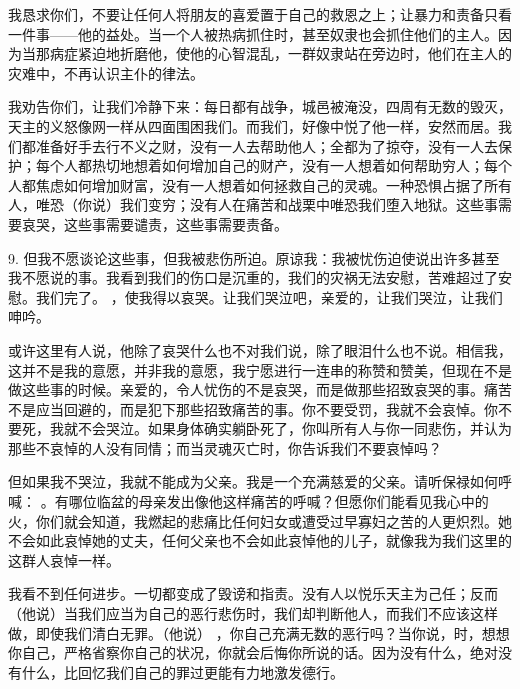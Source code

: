 我恳求你们，不要让任何人将朋友的喜爱置于自己的救恩之上；让暴力和责备只看一件事——他的益处。当一个人被热病抓住时，甚至奴隶也会抓住他们的主人。因为当那病症紧迫地折磨他，使他的心智混乱，一群奴隶站在旁边时，他们在主人的灾难中，不再认识主仆的律法。\par

我劝告你们，让我们冷静下来：每日都有战争，城邑被淹没，四周有无数的毁灭，天主的义怒像网一样从四面围困我们。而我们，好像中悦了他一样，安然而居。我们都准备好手去行不义之财，没有一人去帮助他人；全都为了掠夺，没有一人去保护；每个人都热切地想着如何增加自己的财产，没有一人想着如何帮助穷人；每个人都焦虑如何增加财富，没有一人想着如何拯救自己的灵魂。一种恐惧占据了所有人，唯恐（你说）我们变穷；没有人在痛苦和战栗中唯恐我们堕入地狱。这些事需要哀哭，这些事需要谴责，这些事需要责备。\par

9. 但我不愿谈论这些事，但我被悲伤所迫。原谅我：我被忧伤迫使说出许多甚至我不愿说的事。我看到我们的伤口是沉重的，我们的灾祸无法安慰，苦难超过了安慰。我们完了。 ，使我得以哀哭。让我们哭泣吧，亲爱的，让我们哭泣，让我们呻吟。\par

或许这里有人说，他除了哀哭什么也不对我们说，除了眼泪什么也不说。相信我，这并不是我的意愿，并非我的意愿，我宁愿进行一连串的称赞和赞美，但现在不是做这些事的时候。亲爱的，令人忧伤的不是哀哭，而是做那些招致哀哭的事。痛苦不是应当回避的，而是犯下那些招致痛苦的事。你不要受罚，我就不会哀悼。你不要死，我就不会哭泣。如果身体确实躺卧死了，你叫所有人与你一同悲伤，并认为那些不哀悼的人没有同情；而当灵魂灭亡时，你告诉我们不要哀悼吗？\par

但如果我不哭泣，我就不能成为父亲。我是一个充满慈爱的父亲。请听保禄如何呼喊： 。有哪位临盆的母亲发出像他这样痛苦的呼喊？但愿你们能看见我心中的火，你们就会知道，我燃起的悲痛比任何妇女或遭受过早寡妇之苦的人更炽烈。她不会如此哀悼她的丈夫，任何父亲也不会如此哀悼他的儿子，就像我为我们这里的这群人哀悼一样。\par

我看不到任何进步。一切都变成了毁谤和指责。没有人以悦乐天主为己任；反而（他说）当我们应当为自己的恶行悲伤时，我们却判断他人，而我们不应该这样做，即使我们清白无罪。（他说）   ，你自己充满无数的恶行吗？当你说，时，想想你自己，严格省察你自己的状况，你就会后悔你所说的话。因为没有什么，绝对没有什么，比回忆我们自己的罪过更能有力地激发德行。\par

